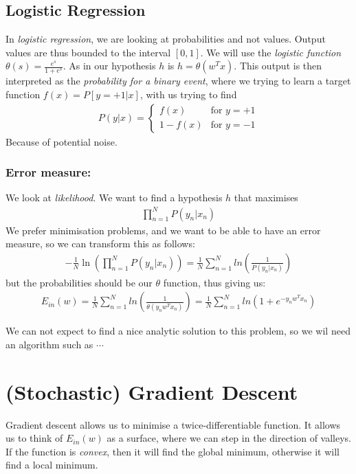 \documentclass{article}
\begin{document}
      \subsection{Logistic Regression}
      In \emph{logistic regression}, we are looking at probabilities and not values. Output values are thus bounded to the interval $[0, 1]$. We will use the \emph{logistic function} $\theta(s) = \frac{e^s}{1+e^s}$. As in our hypothesis $h$ is $h = \theta(w^Tx)$. This output is then interpreted as the \emph{probability for a binary event}, where we trying to learn a target function $f(x) = P[y = +1 | x]$, with us trying to find
      \begin{align}
        P(y | x) = \begin{cases}
          f(x) & \text{for } y = +1\\
          1 - f(x) & \text{for } y = -1
        \end{cases}
      \end{align}
      Because of potential noise.

      \subsubsection{Error measure:}
      We look at \emph{likelihood}. We want to find a hypothesis $h$ that maximises
      \begin{align}
        \prod_{n=1}^{N}{P(y_n | x_n)}
      \end{align}
      We prefer minimisation problems, and we want to be able to have an error measure, so we can transform this as follows:
      \begin{align}
        - \frac{1}{N} \ln{(\prod_{n=1}^{N}P(y_n | x_n))} = \frac{1}{N}\sum_{n=1}^{N}ln(\frac{1}{P(y_n | x_n)})
      \end{align}
      but the probabilities should be our $\theta$ function, thus giving us:
     \begin{align}
        E_{in}(w) = \frac{1}{N}\sum_{n=1}^{N}ln(\frac{1}{\theta(y_n w^Tx_n)}) = \frac{1}{N}\sum_{n=1}^{N}ln(1 + e^{-y_n w^T x_n})
     \end{align} 

     We can not expect to find a nice analytic solution to this problem, so we wil need an algorithm such as $\cdots$
\section{(Stochastic) Gradient Descent}
     Gradient descent allows us to minimise a twice-differentiable function. It allows us to think of $E_{in}(w)$ as a surface, where we can step in the direction of valleys. If the function is \emph{convex}, then it will find the global minimum, otherwise it will find a local minimum. 
\end{document}
